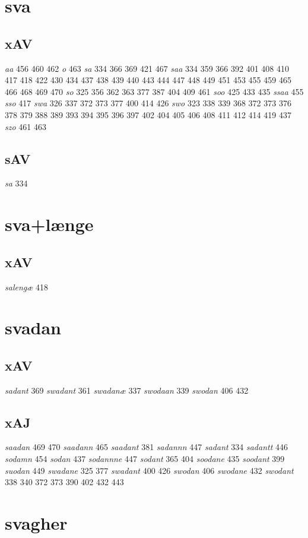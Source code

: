 \documentclass[a4paper,twocolumn]{article}
\begin{document}
\section{sva}
\label{sec:org9b4985d}
\subsection{xAV}
\label{sec:org88a0291}
\emph{aa} 456 460 462 \emph{o} 463 \emph{sa} 334 366 369 421 467 \emph{saa} 334 359 366 392 401 408 410 417 418 422 430 434 437 438 439 440 443 444 447 448 449 451 453 455 459 465 466 468 469 470 \emph{so} 325 356 362 363 377 387 404 409 461 \emph{soo} 425 433 435 \emph{ssaa} 455 \emph{sso} 417 \emph{swa} 326 337 372 373 377 400 414 426 \emph{swo} 323 338 339 368 372 373 376 378 379 388 389 393 394 395 396 397 402 404 405 406 408 411 412 414 419 437 \emph{szo} 461 463 
\subsection{sAV}
\label{sec:org3f5db6d}
\emph{sa} 334 
\section{sva+længe}
\label{sec:org8c31365}
\subsection{xAV}
\label{sec:org108c35b}
\emph{salengæ} 418 
\section{svadan}
\label{sec:orgdca65aa}
\subsection{xAV}
\label{sec:orgcf32e98}
\emph{sadant} 369 \emph{swadant} 361 \emph{swadanæ} 337 \emph{swodaan} 339 \emph{swodan} 406 432 
\subsection{xAJ}
\label{sec:org9a29530}
\emph{saadan} 469 470 \emph{saadann} 465 \emph{saadant} 381 \emph{sadannn} 447 \emph{sadant} 334 \emph{sadantt} 446 \emph{sodamn} 454 \emph{sodan} 437 \emph{sodannne} 447 \emph{sodant} 365 404 \emph{soodane} 435 \emph{soodant} 399 \emph{suodan} 449 \emph{swadane} 325 377 \emph{swadant} 400 426 \emph{swodan} 406 \emph{swodane} 432 \emph{swodant} 338 340 372 373 390 402 432 443 
\section{svagher}
\label{sec:org2cc2c7c}
\end{document}
